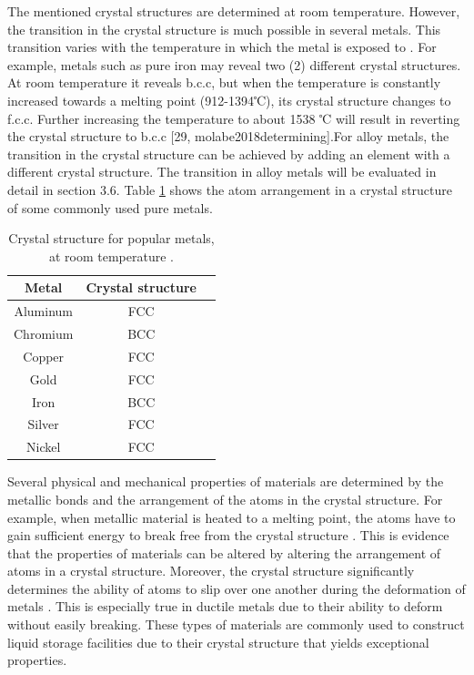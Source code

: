 \documentclass[12pt]{report}
\begin{document}
The mentioned crystal structures are determined at room temperature.  However, the transition in the crystal structure is much possible in several metals. This transition varies with the temperature in which the metal is exposed to \cite{callister2018materials}. For example, metals such as pure iron may reveal two (2) different crystal structures. At room temperature it reveals b.c.c, but when the temperature is constantly increased towards a melting point (912-1394℃), its crystal structure changes to f.c.c. Further increasing the temperature to about 1538 ℃ will result in reverting the crystal structure to b.c.c [29, molabe2018determining].For alloy metals, the transition in the crystal structure can be achieved by adding an element with a different crystal structure. The transition in alloy metals will be evaluated in detail in section 3.6. Table \ref{ch3:table:structure} shows the atom arrangement in a crystal structure of some commonly used pure metals.

\begin{table}[H]
\caption{Crystal structure for popular metals, at room temperature \cite{hench2005biomaterials}.}

\centering
\begin{tabular}{ c c c }
    \hline
    Metal & Crystal structure \\
    \hline
    Aluminum & FCC \\
    Chromium & BCC \\
    Copper & FCC \\
    Gold & FCC \\
    Iron & BCC \\
    Silver & FCC \\
    Nickel & FCC \\
    \hline
\end{tabular}

\label{ch3:table:structure}
\end{table}

Several physical and mechanical properties of materials are determined by the metallic bonds and the arrangement of the atoms in the crystal structure. For example, when metallic material is heated to a melting point, the atoms have to gain sufficient energy to break free from the crystal structure \cite{hench2005biomaterials}. This is evidence that the properties of materials can be altered by altering the arrangement of atoms in a crystal structure. Moreover, the crystal structure significantly determines the ability of atoms to slip over one another during the deformation of metals \cite{callister2018materials}. This is especially true in ductile metals due to their ability to deform without easily breaking. These types of materials are commonly used to construct liquid storage facilities due to their crystal structure that yields exceptional properties.
\end{document}
